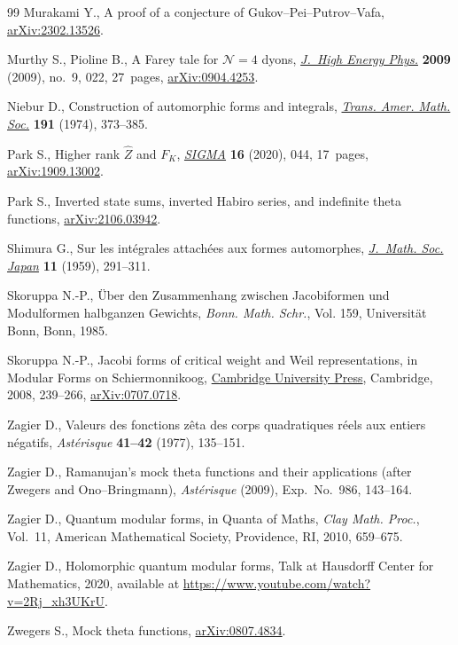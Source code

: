 \documentclass[pdftex]{sigma}
\theoremstyle{definition}
\numberwithin{equation}{section}
\begin{document}
\begin{thebibliography}{99}
Murakami Y., A proof of a conjecture of {G}ukov--{P}ei--{P}utrov--{V}afa,
 \href{https://arxiv.org/abs/2302.13526}{arXiv:2302.13526}.

Murthy S., Pioline B., A {F}arey tale for {${\mathcal N}=4$} dyons,
 \href{https://doi.org/10.1088/1126-6708/2009/09/022}{\textit{J.~High Energy Phys.}} \textbf{2009} (2009), no.~9, 022, 27~pages,
 \href{https://arxiv.org/abs/0904.4253}{arXiv:0904.4253}.

Niebur D., Construction of automorphic forms and integrals, \href{https://doi.org/10.2307/1997003}{\textit{Trans.
 Amer. Math. Soc.}} \textbf{191} (1974), 373--385.

Park S., Higher rank {$\hat{Z}$} and {$F_K$}, \href{https://doi.org/10.3842/SIGMA.2020.044}{\textit{SIGMA}} \textbf{16}
 (2020), 044, 17~pages, \href{https://arxiv.org/abs/1909.13002}{arXiv:1909.13002}.

Park S., Inverted state sums, inverted {H}abiro series, and indefinite theta
 functions, \href{https://arxiv.org/abs/2106.03942}{arXiv:2106.03942}.

Shimura G., Sur les int\'egrales attach\'ees aux formes automorphes,
 \href{https://doi.org/10.2969/jmsj/01140291}{\textit{J.~Math. Soc. Japan}} \textbf{11} (1959), 291--311.

Skoruppa N.-P., \"Uber den {Z}usammenhang zwischen {J}acobiformen und
 {M}odulformen halbganzen {G}ewichts, \textit{Bonn. Math. Schr.}, Vol. 159,
 Universit\"at Bonn, Bonn, 1985.

Skoruppa N.-P., Jacobi forms of critical weight and {W}eil representations, in
 Modular {F}orms on {S}chiermonnikoog, \href{https://doi.org/10.1017/CBO9780511543371.013}{Cambridge University Press}, Cambridge,
 2008, 239--266, \href{https://arxiv.org/abs/0707.0718}{arXiv:0707.0718}.

Zagier D., Valeurs des fonctions z\^eta des corps quadratiques r\'eels aux
 entiers n\'egatifs, \textit{Ast\'erisque} \textbf{41--42} (1977), 135--151.

Zagier D., Ramanujan's mock theta functions and their applications (after
 {Z}wegers and {O}no--{B}ringmann), \textit{Ast\'erisque} (2009),
 Exp.~No.~986, 143--164.

Zagier D., Quantum modular forms, in Quanta of {M}aths, \textit{Clay Math.
 Proc.}, Vol.~11, American Mathematical Society, Providence, RI, 2010,
 659--675.

Zagier D., Holomorphic quantum modular forms,
{T}alk at {H}ausdorff {C}enter for {M}athematics, 2020, available at \url{https://www.youtube.com/watch?v=2Rj_xh3UKrU}.

Zwegers S., Mock theta functions, \href{https://arxiv.org/abs/0807.4834}{arXiv:0807.4834}.

\end{thebibliography}\LastPageEnding
\end{document}
